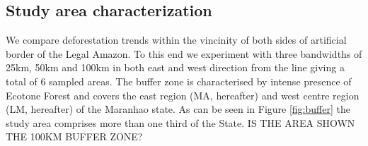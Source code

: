 

\subsection{Study area characterization} \label{studycarac} %


We compare deforestation trends within the vincinity of both sides of artificial border of the Legal Amazon.  To this end we experiment with three bandwidths of 25km, 50km and 100km in both east and west direction from the line giving a total of 6 sampled areas. The buffer zone is characterised by intense presence of Ecotone Forest and covers the east region (MA, hereafter) and west centre region (LM, hereafter) of the Maranhao state. As can be seen in Figure \ref{fig:buffer} the study area comprises more than one third of the State. IS THE AREA SHOWN THE 100KM BUFFER ZONE?  

